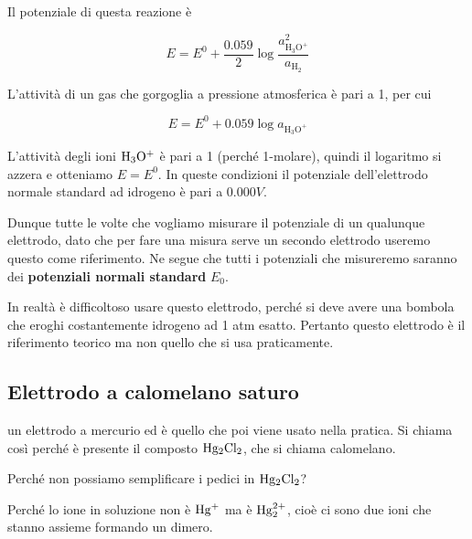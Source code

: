 Il potenziale di questa reazione è

$$E = E^0 + \frac{0.059}{2} \log \frac{a^2_{\text{H}_3\text{O}^+}}{a_{\text{H}_2}}$$

L'attività di un gas che gorgoglia a pressione atmosferica è pari a 1, per cui

$$E = E^0 + 0.059 \log a_{\text{H}_3\text{O}^+}$$

L'attività degli ioni $\rm H_3O^+$ è pari a 1 (perché 1-molare), quindi il logaritmo si azzera e otteniamo $E=E^0$. In queste condizioni il potenziale dell'elettrodo normale standard ad idrogeno è pari a $0.000 V$.

Dunque tutte le volte che vogliamo misurare il potenziale di un qualunque elettrodo, dato che per fare una misura serve un secondo elettrodo useremo questo come riferimento. Ne segue che tutti i potenziali che misureremo saranno dei \textbf{potenziali normali standard} $E_0$.

In realtà è difficoltoso usare questo elettrodo, perché si deve avere una bombola che eroghi costantemente idrogeno ad 1 atm esatto. Pertanto questo elettrodo è il riferimento teorico ma non quello che si usa praticamente.
\subsection{Elettrodo a calomelano saturo}
\E un elettrodo a mercurio ed è quello che poi viene usato nella pratica. Si chiama così perché è presente il composto $\rm Hg_2Cl_2$, che si chiama calomelano.

Perché non possiamo semplificare i pedici in $\rm Hg_2Cl_2$?

Perché lo ione in soluzione non è $\rm Hg^+$ ma è $\rm Hg_2^{2+}$, cioè ci sono due ioni che stanno assieme formando un dimero.

